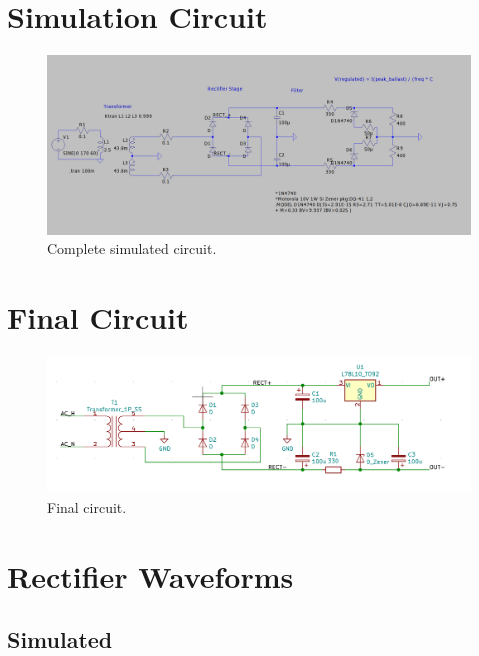 \documentclass[12pt]{article}
\begin{document}
\begin{appendix}

\section{Simulation Circuit}
\label{app:simulation}

\begin{figure}[H]
    \centering
    \includegraphics[width=\linewidth]{./SPICE/circuit.png}
    \caption{Complete simulated circuit.}
    \label{fig:simulated_circuit}
\end{figure}

\section{Final Circuit}
\label{app:circuit}

\begin{figure}[H]
    \centering
    \includegraphics[width=\linewidth]{./res/image/circuit.png}
    \caption{Final circuit.}
    \label{fig:final_circuit}
\end{figure}

\newpage

\section{Rectifier Waveforms}

\subsection{Simulated}


\end{appendix}
\end{document}
